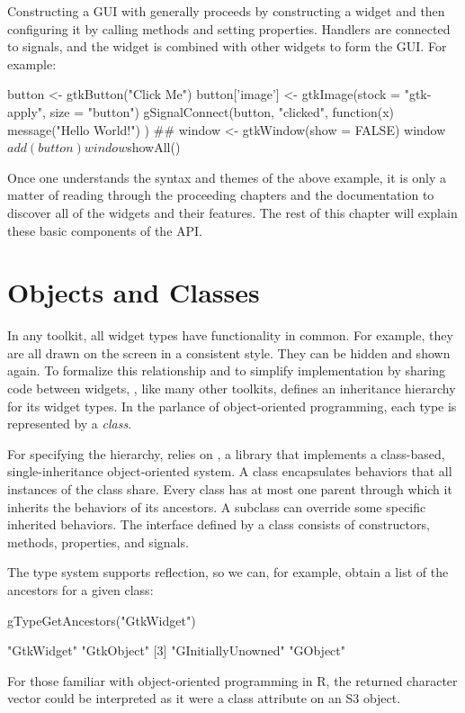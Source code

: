 Constructing a GUI with  generally proceeds by constructing
a widget and then configuring it by calling methods and setting
properties. Handlers are connected to signals, and the widget is
combined with other widgets to form the GUI. For example:
\begin{Schunk}
\begin{Sinput}
 button <- gtkButton("Click Me")
 button['image'] <- gtkImage(stock = "gtk-apply", size = "button")
 gSignalConnect(button, "clicked", function(x) {
   message("Hello World!")
 })
 ##
 window <- gtkWindow(show = FALSE)
 window$add(button)
 window$showAll()
\end{Sinput}
\end{Schunk}
% 
Once one understands the syntax and themes of the above example, it is
only a matter of reading through the proceeding chapters and the
documentation to discover all of the widgets and their features. The
rest of this chapter will explain these basic components of the API.

\section{Objects and Classes}

In any toolkit, all widget types have functionality in common. For
example, they are all drawn on the screen in a consistent style. They
can be hidden and shown again. To formalize this relationship and to
simplify implementation by sharing code between widgets, ,
like many other toolkits, defines an inheritance hierarchy for its
widget types. In the parlance of object-oriented programming, each
type is represented by a \textit{class}.

For specifying the hierarchy,  relies on , a
 library that implements a class-based, single-inheritance
object-oriented system. A  class encapsulates behaviors
that all instances of the class share. Every class has at most one
parent through which it inherits the behaviors of its ancestors. A
subclass can override some specific inherited behaviors. The interface
defined by a class consists of constructors, methods, properties,
and signals. 

The type system supports reflection, so we can, for example, obtain a
list of the ancestors for a given class:
\begin{Schunk}
\begin{Sinput}
 gTypeGetAncestors("GtkWidget")
\end{Sinput}
\begin{Soutput}
[1] "GtkWidget"         "GtkObject"        
[3] "GInitiallyUnowned" "GObject"          
\end{Soutput}
\end{Schunk}
%
For those familiar with object-oriented programming in R, the returned
character vector could be interpreted as it were a class attribute on
an S3 object.

